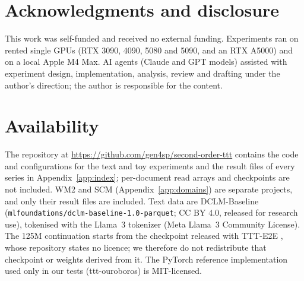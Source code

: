 \documentclass[11pt]{article}
\newcommand{\availurl}{\url{https://github.com/gen4sp/second-order-ttt}}
\begin{document}
\section*{Acknowledgments and disclosure}
This work was self-funded and received no external funding. Experiments ran on rented single GPUs (RTX 3090, 4090, 5080 and 5090, and an RTX A5000) and on a local
Apple M4 Max. AI agents (Claude and GPT models) assisted with experiment design, implementation,
analysis, review and drafting under the author's direction; the author is responsible for the
content.

\section*{Availability}
The repository at \availurl{} contains the code and configurations for the text and toy experiments
and the result files of every series in Appendix~\ref{app:index}; per-document read arrays and
checkpoints are not included. WM2 and SCM (Appendix~\ref{app:domains}) are separate projects, and only
their result files are included. Text data are DCLM-Baseline \citep{li2024dclm}
(\texttt{mlfoundations/dclm-baseline-1.0-parquet}; CC BY 4.0, released for research use), tokenised
with the Llama~3 tokenizer (Meta Llama~3 Community License). The 125M continuation starts from the
checkpoint released with TTT-E2E \citep{tandon2025e2e}, whose repository states no licence; we
therefore do not redistribute that checkpoint or weights derived from it. The PyTorch reference
implementation used only in our tests (ttt-ouroboros) is MIT-licensed.

\FloatBarrier
\end{document}
